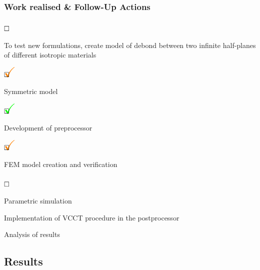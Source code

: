 \documentclass[first,firstsupp,lastsupp,handout,last,hyperref,table]{ETHclass}
\begin{document}
\begin{frame}
\frametitle{Work realised \& Follow-Up Actions}
\vspace{-0.5cm}
\scriptsize
\begin{list}{$\text{\rlap{\textcolor{white}{\huge$\mathbf{\checkmark}$}}}\square$}{}  
\item To test new formulations, create model of debond between two infinite half-planes of different isotropic materials
\begin{list}{$\text{\rlap{\textcolor{orange}{\huge$\mathbf{\checkmark}$}}}\square$}{} 
\item Symmetric model
\begin{list}{$\text{\rlap{\textcolor{green}{\huge$\mathbf{\checkmark}$}}}\square$}{}
\item Development of preprocessor
\end{list}
\begin{list}{$\text{\rlap{\textcolor{orange}{\huge$\mathbf{\checkmark}$}}}\square$}{}
\item FEM model creation and verification
\end{list}
\begin{list}{$\text{\rlap{\textcolor{white}{\huge$\mathbf{\checkmark}$}}}\square$}{}
\item Parametric simulation
\item Implementation of VCCT procedure in the postprocessor
\item Analysis of results
\end{list}
\end{list}
\end{list}
\end{frame}

\subsection{Results}
\end{document}
